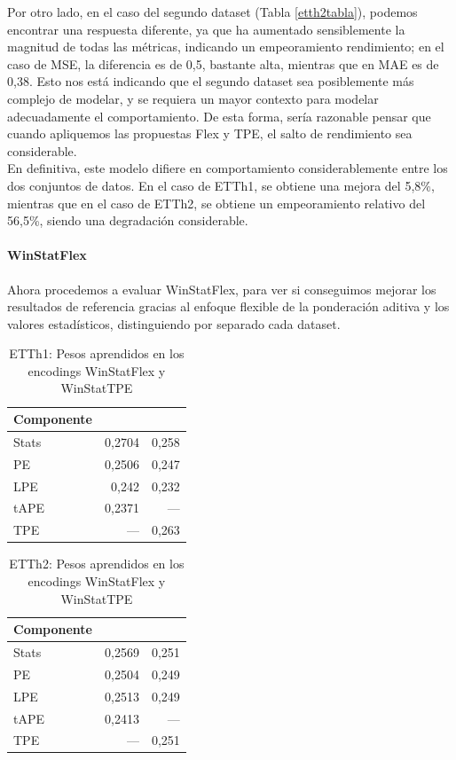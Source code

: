  Por otro lado, en el caso del segundo dataset (Tabla \ref{etth2tabla}), podemos encontrar una respuesta diferente, ya que ha aumentado sensiblemente la magnitud de todas las métricas, indicando un empeoramiento rendimiento; en el caso de MSE, la diferencia es de 0,5, bastante alta, mientras que en MAE es de 0,38. Esto nos está indicando que el segundo dataset sea posiblemente más complejo de modelar, y se requiera un mayor contexto para modelar adecuadamente el comportamiento. De esta forma, sería razonable pensar que cuando apliquemos las propuestas Flex y TPE, el salto de rendimiento sea considerable.\\
  
  En definitiva, este modelo difiere en comportamiento considerablemente entre los dos conjuntos de datos. En el caso de ETTh1, se obtiene una mejora del 5,8\%, mientras que en el caso de ETTh2, se obtiene un empeoramiento relativo del 56,5\%, siendo una degradación considerable.
 
 \paragraph{WinStatFlex}
 
Ahora procedemos a evaluar WinStatFlex, para ver si conseguimos mejorar los resultados de referencia gracias al enfoque flexible de la ponderación aditiva y los valores estadísticos, distinguiendo por separado cada dataset.\\


\begin{table}[!ht]
	\centering
	\begin{tabular}{lNN}
		\toprule
		Componente &  &  \\
		\midrule
		Stats & 0,2704 & 0,258 \\
		PE    & 0,2506 & 0,247 \\
		LPE   & 0,242  & 0,232 \\
		tAPE  & 0,2371 & —     \\
		TPE   & —      & 0,263 \\
		\bottomrule
	\end{tabular}
	\caption{ETTh1: Pesos aprendidos en los encodings WinStatFlex y WinStatTPE}
	\label{etth1_pesos}
\end{table}

\begin{table}[!ht]
	\centering
	\begin{tabular}{lNN}
		\toprule
		Componente &  &  \\
		\midrule
		Stats & 0,2569 & 0,251 \\
		PE    & 0,2504 & 0,249 \\
		LPE   & 0,2513 & 0,249 \\
		tAPE  & 0,2413 & —     \\
		TPE   & —      & 0,251 \\
		\bottomrule
	\end{tabular}
	\caption{ETTh2: Pesos aprendidos en los encodings WinStatFlex y WinStatTPE}
	\label{etth2_pesos}
\end{table}


